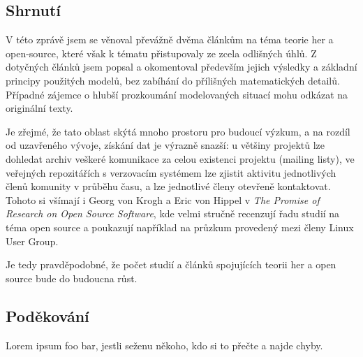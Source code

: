 \begin{multicols}{2}
\section{Shrnutí}
	V této zprávě jsem se věnoval převážně dvěma článkům na téma teorie her a open-source, které však k tématu přistupovaly ze zcela odlišných úhlů. Z dotyčných článků jsem popsal a okomentoval především jejich výsledky a základní principy použitých modelů, bez zabíhání do přílišných matematických detailů. Případné zájemce o hlubší prozkoumání modelovaných situací mohu odkázat na originální texty.

	Je zřejmé, že tato oblast skýtá mnoho prostoru pro budoucí výzkum, a na rozdíl od uzavřeného vývoje, získání dat je výrazně snazší: u většiny projektů lze dohledat archiv veškeré komunikace za celou existenci projektu (mailing listy), ve veřejných repozitářích s verzovacím systémem lze zjistit aktivitu jednotlivých členů komunity v průběhu času, a lze jednotlivé členy otevřeně kontaktovat. Tohoto si všímají i Georg von Krogh a Eric von Hippel v {\em The Promise of Research on Open Source Software}, kde velmi stručně recenzují řadu studií na téma open source a poukazují například na průzkum provedený mezi členy Linux User Group.

	Je tedy pravděpodobné, že počet studií a článků spojujících teorii her a open source bude do budoucna růst.



\subsection*{Poděkování}
Lorem ipsum foo bar, jestli seženu někoho, kdo si to přečte a najde chyby.




%

\end{multicols}
